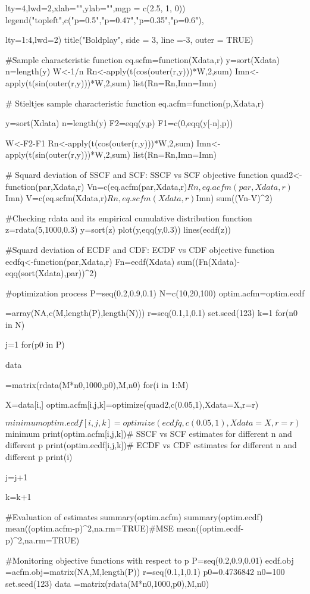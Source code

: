 lty=4,lwd=2,xlab="",ylab="",mgp = c(2.5, 1, 0))
legend("topleft",c("p=0.5","p=0.47","p=0.35","p=0.6"),

lty=1:4,lwd=2)
title("Boldplay", side = 3, line =-3, outer = TRUE)

#Sample characteristic function
eq.scfm=function(Xdata,r){
   y=sort(Xdata)
   n=length(y)
   W<-1/n
   Rn<-apply(t(cos(outer(r,y)))*W,2,sum)
   Imn<-apply(t(sin(outer(r,y)))*W,2,sum)
   list(Rn=Rn,Imn=Imn)
}

# Stieltjes sample characteristic function
eq.acfm=function(p,Xdata,r){
   y=sort(Xdata)
   n=length(y)
   F2=eqq(y,p)
   F1=c(0,eqq(y[-n],p))
   
   
   W<-F2-F1
   Rn<-apply(t(cos(outer(r,y)))*W,2,sum)
   Imn<-apply(t(sin(outer(r,y)))*W,2,sum)
   list(Rn=Rn,Imn=Imn)
}

# Squard deviation of SSCF and SCF: SSCF vs SCF objective function
quad2<-function(par,Xdata,r){
    Vn=c(eq.acfm(par,Xdata,r)$Rn,eq.acfm(par,Xdata,r)$Imn)
    V=c(eq.scfm(Xdata,r)$Rn,eq.scfm(Xdata,r)$Imn)
    sum((Vn-V)^2)
}

#Checking rdata and its empirical cumulative distribution function
z=rdata(5,1000,0.3)
y=sort(z)
plot(y,eqq(y,0.3))
lines(ecdf(z))

#Squard deviation of ECDF and CDF: ECDF vs CDF objective function
ecdfq<-function(par,Xdata,r){
Fn=ecdf(Xdata) 
  sum((Fn(Xdata)-eqq(sort(Xdata),par))^2)
}

#optimization process
P=seq(0.2,0.9,0.1)
N=c(10,20,100)
optim.acfm=optim.ecdf

=array(NA,c(M,length(P),length(N)))
r=seq(0.1,1,0.1)
set.seed(123)
k=1
for(n0 in N){
j=1
for(p0 in P){
data

=matrix(rdata(M*n0,1000,p0),M,n0)
 for(i in 1:M)
 {
  X=data[i,]
  optim.acfm[i,j,k]=optimize(quad2,c(0.05,1),Xdata=X,r=r)
  
  $minimum
  optim.ecdf[i,j,k]=optimize(ecdfq,c(0.05,1),Xdata=X,r=r)$minimum
  print(optim.acfm[i,j,k])# SSCF vs SCF estimates 
  for different n and different p
  print(optim.ecdf[i,j,k])# ECDF vs CDF estimates 
  for different n and different p
  print(i)
}
j=j+1
}
k=k+1
}

#Evaluation of estimates
summary(optim.acfm)
summary(optim.ecdf)
mean((optim.acfm-p)^2,na.rm=TRUE)#MSE
mean((optim.ecdf-p)^2,na.rm=TRUE)

#Monitoring objective functions with respect to p
P=seq(0.2,0.9,0.01)
ecdf.obj
=acfm.obj=matrix(NA,M,length(P))
r=seq(0.1,1,0.1)
p0=0.4736842
n0=100
set.seed(123)
data
=matrix(rdata(M*n0,1000,p0),M,n0)

